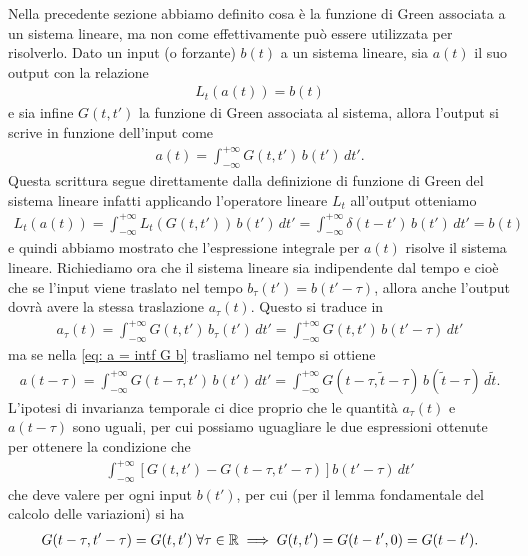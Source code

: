 Nella precedente sezione abbiamo definito cosa è la funzione di Green associata a un sistema lineare, ma non come effettivamente può essere 
utilizzata per risolverlo. Dato un input (o forzante) $ b(t) $ a un sistema lineare, sia $ a(t) $ il suo output con la relazione 
\begin{align}
  L_t(a(t)) = b(t)
\end{align}
e sia infine $ G(t, t') $ la funzione di Green associata al sistema, allora l'output si scrive in funzione dell'input come 
\begin{align}
  a(t) = \int_{-\infty}^{+\infty} G(t,t')\,b(t') \, dt'. \label{eq: a = intf G b}
\end{align}
Questa scrittura segue direttamente dalla definizione di funzione di Green del sistema lineare infatti applicando l'operatore lineare 
$ L_t $ all'output otteniamo 
\begin{align}
  L_t(a(t)) = \int_{-\infty}^{+\infty} L_t(G(t,t'))\,b(t')\, dt' = \int_{-\infty}^{+\infty} \delta(t - t')\,b(t') \, dt' = b(t)
\end{align}
e quindi abbiamo mostrato che l'espressione integrale per $ a(t) $ risolve il sistema lineare. Richiediamo ora che il sistema lineare sia 
indipendente dal tempo e cioè che se l'input viene traslato nel tempo $ b_\tau(t') = b(t' - \tau) $, allora anche l'output dovrà avere la stessa traslazione 
$ a_\tau(t) $. Questo si traduce in 
\begin{align}
  a_\tau(t) = \int_{-\infty}^{+\infty} G(t,t')\,b_\tau(t')\,dt' = \int_{-\infty}^{+\infty} G(t,t')\,b(t' - \tau)\,dt'
\end{align}
ma se nella \eqref{eq: a = intf G b} trasliamo nel tempo si ottiene
\begin{align}
  a(t - \tau) = \int_{-\infty}^{+\infty} G(t - \tau, t')\,b(t')\,dt' 
  = \int_{-\infty}^{+\infty} G(t - \tau,\tilde{t} - \tau)\,b(\tilde{t} - \tau)\,d\tilde{t}.
\end{align}
L'ipotesi di invarianza temporale ci dice proprio che le quantità $ a_\tau(t) $ e $ a(t - \tau) $ sono uguali, per cui possiamo uguagliare le due 
espressioni ottenute per ottenere la condizione che 
\begin{align}
  \int_{-\infty}^{+\infty} \left[ G(t, t') - G(t - \tau, t' - \tau) \right] b(t' - \tau) \,dt'
\end{align}
che deve valere per ogni input $ b(t') $, per cui (per il lemma fondamentale del calcolo delle variazioni) si ha
\begin{align}
  G(t - \tau,t' - \tau) = G(t,t') \; \forall \tau \in \mathbb{R} \implies G(t, t') = G(t - t', 0) = G(t-t').
\end{align}

